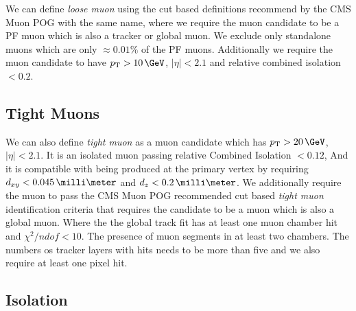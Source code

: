 %

We can define \textit{loose muon} using the cut based definitions recommend by the \gls{CMS} Muon \gls{POG} with the same name, where we require the muon candidate to be a \gls{PF} muon which is also a tracker or global muon. We exclude only standalone muons which are only $\approx 0.01\%$ of the \gls{PF} muons. Additionally we require the muon candidate to have $\pt>10\,\GeV$, $|\eta|<2.1$ and relative combined isolation $<0.2$.

\subsection{Tight Muons}

We can also define \textit{tight muon} as a muon candidate which has $\pt>20\,\GeV$, $|\eta|<2.1$. It is an isolated muon passing relative Combined Isolation $<0.12$, And it is compatible with being produced at the primary vertex by requiring $d_{xy}<0.045\,\milli\meter$ and $d_z < 0.2\,\milli\meter$. We additionally require the muon to pass the  \gls{CMS} Muon \gls{POG} recommended cut based \textit{tight muon} identification criteria that requires the candidate to be a  muon which is also a global muon. Where the the global track fit has at least one muon chamber hit and $\chi^2/ndof < 10$. The presence of muon segments in at least two chambers. The numbers os tracker layers with hits needs to be more than five and we also require at least one pixel hit.

\subsection{Isolation}
\label{SUBSECTION:EventReconstructionPhysicsObjects_LeptonIsolation_MuonsIsolation}

